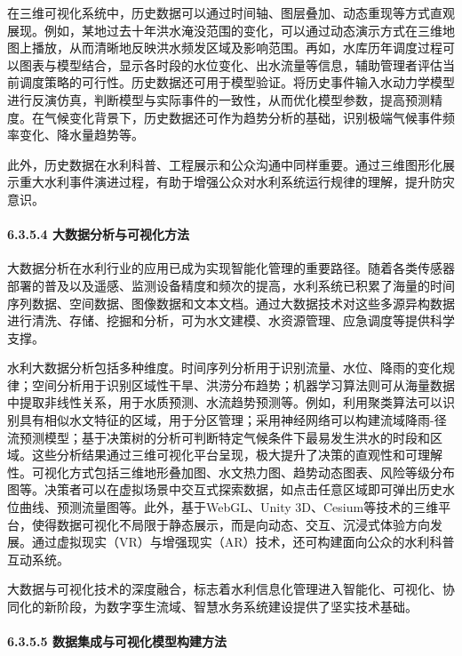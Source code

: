 在三维可视化系统中，历史数据可以通过时间轴、图层叠加、动态重现等方式直观展现。例如，某地过去十年洪水淹没范围的变化，可以通过动态演示方式在三维地图上播放，从而清晰地反映洪水频发区域及影响范围。再如，水库历年调度过程可以图表与模型结合，显示各时段的水位变化、出水流量等信息，辅助管理者评估当前调度策略的可行性。历史数据还可用于模型验证。将历史事件输入水动力学模型进行反演仿真，判断模型与实际事件的一致性，从而优化模型参数，提高预测精度。在气候变化背景下，历史数据还可作为趋势分析的基础，识别极端气候事件频率变化、降水量趋势等。

此外，历史数据在水利科普、工程展示和公众沟通中同样重要。通过三维图形化展示重大水利事件演进过程，有助于增强公众对水利系统运行规律的理解，提升防灾意识。

\hypertarget{ux5927ux6570ux636eux5206ux6790ux4e0eux53efux89c6ux5316ux65b9ux6cd5}{%
\paragraph{6.3.5.4 大数据分析与可视化方法}\label{ux5927ux6570ux636eux5206ux6790ux4e0eux53efux89c6ux5316ux65b9ux6cd5}}

大数据分析在水利行业的应用已成为实现智能化管理的重要路径。随着各类传感器部署的普及以及遥感、监测设备精度和频次的提高，水利系统已积累了海量的时间序列数据、空间数据、图像数据和文本文档。通过大数据技术对这些多源异构数据进行清洗、存储、挖掘和分析，可为水文建模、水资源管理、应急调度等提供科学支撑。

水利大数据分析包括多种维度。时间序列分析用于识别流量、水位、降雨的变化规律；空间分析用于识别区域性干旱、洪涝分布趋势；机器学习算法则可从海量数据中提取非线性关系，用于水质预测、水流趋势预测等。例如，利用聚类算法可以识别具有相似水文特征的区域，用于分区管理；采用神经网络可以构建流域降雨-径流预测模型；基于决策树的分析可判断特定气候条件下最易发生洪水的时段和区域。这些分析结果通过三维可视化平台呈现，极大提升了决策的直观性和可理解性。可视化方式包括三维地形叠加图、水文热力图、趋势动态图表、风险等级分布图等。决策者可以在虚拟场景中交互式探索数据，如点击任意区域即可弹出历史水位曲线、预测流量图等。此外，基于WebGL、Unity 3D、Cesium等技术的三维平台，使得数据可视化不局限于静态展示，而是向动态、交互、沉浸式体验方向发展。通过虚拟现实（VR）与增强现实（AR）技术，还可构建面向公众的水利科普互动系统。

大数据与可视化技术的深度融合，标志着水利信息化管理进入智能化、可视化、协同化的新阶段，为数字孪生流域、智慧水务系统建设提供了坚实技术基础。

\hypertarget{ux6570ux636eux96c6ux6210ux4e0eux53efux89c6ux5316ux6a21ux578bux6784ux5efaux65b9ux6cd5-1}{%
\paragraph{6.3.5.5 数据集成与可视化模型构建方法}\label{ux6570ux636eux96c6ux6210ux4e0eux53efux89c6ux5316ux6a21ux578bux6784ux5efaux65b9ux6cd5-1}}


